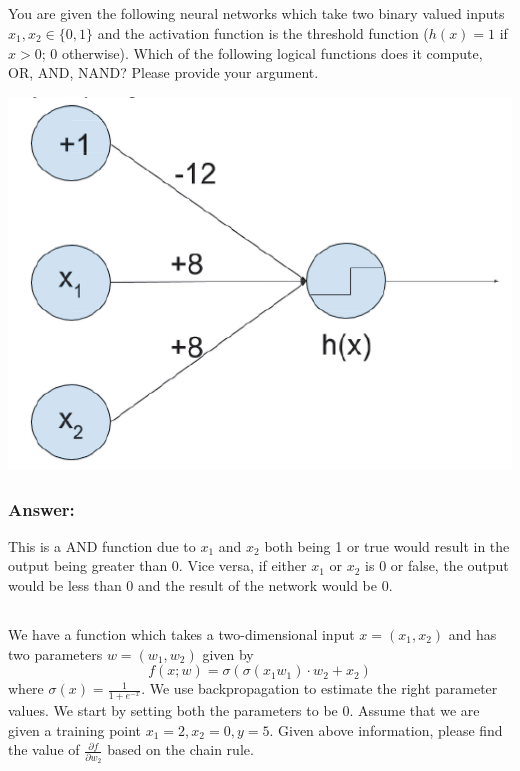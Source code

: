 \documentclass{article}
\begin{document}
\subsection{}
You are given the following neural networks which take two binary valued inputs $x_1,x_2 \in \{0,1\}$ and the activation function is the threshold function ($h(x) = 1$ if $x > 0$; $0$ otherwise). Which of the following logical functions does it compute, OR, AND, NAND\@? Please provide your argument.

\begin{center}
    \includegraphics[scale=0.5]{images/Q3P1A.png}
\end{center}

\subsubsection*{Answer:}
This is a AND function due to $x_1$ and $x_2$ both being 1 or true would result in the output being greater than 0. Vice versa, if either $x_1$ or $x_2$ is 0 or false, the output would be less than 0 and the result of the network would be 0.

\subsection{}
We have a function which takes a two-dimensional input $x = (x_1,x_2)$ and has two parameters $w = (w_1,w_2)$ given by
\begin{equation}
    f(x;w) = {\sigma}({\sigma}{(x_1w_1)}\cdot{w_2}+{x_2})
\end{equation}
where $\sigma(x) = \frac{1}{1+e^{-x}}$.
We use backpropagation to estimate the right parameter values. We start by setting both the parameters to be 0. Assume that we are given a training point $x_1 = 2, x_2 = 0, y = 5$. Given above information, please find the value of $\frac{\partial f}{\partial w_2}$ based on the chain rule.
\end{document}
